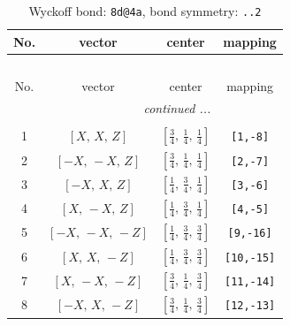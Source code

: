 \documentclass[fleqn,8pt]{jsarticle}
\begin{document}
\renewcommand{\arraystretch}{1.2}
\begin{longtable}{cccc}
\caption{Wyckoff bond: {\tt 8d@4a}, bond symmetry: {\tt ..2}}
 \\
 \hline \hline
No. & vector & center & mapping \\ \hline \endfirsthead

\multicolumn{3}{l}{\tablename\ \thetable{}} \\
 \hline \hline
No. & vector & center & mapping \\ \hline \endhead

 \hline \hline
\multicolumn{3}{r}{\footnotesize\it continued ...} \\ \endfoot

 \hline \hline
\multicolumn{3}{r}{} \\ \endlastfoot

1 & $\left[ X,\, X,\, Z \right]$ & $\left[ \frac{3}{4},\, \frac{1}{4},\, \frac{1}{4} \right]$ & {\tt [1,-8]} \\ \hline
2 & $\left[ - X,\, - X,\, Z \right]$ & $\left[ \frac{3}{4},\, \frac{1}{4},\, \frac{1}{4} \right]$ & {\tt [2,-7]} \\ \hline
3 & $\left[ - X,\, X,\, Z \right]$ & $\left[ \frac{1}{4},\, \frac{3}{4},\, \frac{1}{4} \right]$ & {\tt [3,-6]} \\ \hline
4 & $\left[ X,\, - X,\, Z \right]$ & $\left[ \frac{1}{4},\, \frac{3}{4},\, \frac{1}{4} \right]$ & {\tt [4,-5]} \\ \hline
5 & $\left[ - X,\, - X,\, - Z \right]$ & $\left[ \frac{1}{4},\, \frac{3}{4},\, \frac{3}{4} \right]$ & {\tt [9,-16]} \\ \hline
6 & $\left[ X,\, X,\, - Z \right]$ & $\left[ \frac{1}{4},\, \frac{3}{4},\, \frac{3}{4} \right]$ & {\tt [10,-15]} \\ \hline
7 & $\left[ X,\, - X,\, - Z \right]$ & $\left[ \frac{3}{4},\, \frac{1}{4},\, \frac{3}{4} \right]$ & {\tt [11,-14]} \\ \hline
8 & $\left[ - X,\, X,\, - Z \right]$ & $\left[ \frac{3}{4},\, \frac{1}{4},\, \frac{3}{4} \right]$ & {\tt [12,-13]} \\
\end{longtable}
\renewcommand{\arraystretch}{1.2}
\end{document}
